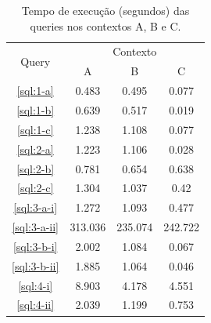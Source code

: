 \documentclass[a4paper,12pt]{article}
\begin{document}
\begin{table}[hpt]
   \centering
   \begin{tabular}{c c c c}
      \toprule
      \multirow{2}{*}{Query} & \multicolumn{3}{c}{Contexto} \\\cline{2-4}
      & A & B & C \\\midrule
      \ref{sql:1-a} & 0.483 & 0.495 & 0.077 \\\midrule
      \ref{sql:1-b} & 0.639 & 0.517 & 0.019 \\\midrule
      \ref{sql:1-c} & 1.238 & 1.108 & 0.077 \\\midrule
      \ref{sql:2-a} & 1.223 & 1.106 & 0.028 \\\midrule
      \ref{sql:2-b} & 0.781 & 0.654 & 0.638 \\\midrule
      \ref{sql:2-c} & 1.304 & 1.037 & 0.42 \\\midrule
      \ref{sql:3-a-i} & 1.272 & 1.093 & 0.477 \\\midrule
      \ref{sql:3-a-ii} & 313.036 & 235.074 & 242.722 \\\midrule
      \ref{sql:3-b-i} & 2.002 & 1.084 & 0.067 \\\midrule
      \ref{sql:3-b-ii} & 1.885 & 1.064 & 0.046 \\\midrule
      \ref{sql:4-i} & 8.903 & 4.178 & 4.551 \\\midrule
      \ref{sql:4-ii} & 2.039 & 1.199 & 0.753 \\\bottomrule
   \end{tabular}
   \caption{Tempo de execução (segundos) das queries nos contextos A, B e C.}
   \label{tab:tempo}
\end{table}
\end{document}
